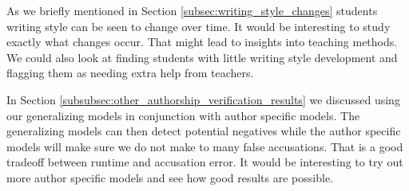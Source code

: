 As we briefly mentioned in Section \ref{subsec:writing_style_changes} students
writing style can be seen to change over time. It would be interesting to study
exactly what changes occur. That might lead to insights into teaching methods.
We could also look at finding students with little writing style development and
flagging them as needing extra help from teachers.

In Section \ref{subsubsec:other_authorship_verification_results} we discussed
using our generalizing models in conjunction with author specific models. The
generalizing models can then detect potential negatives while the author
specific models will make sure we do not make to many false accusations. That is
a good tradeoff between runtime and accusation error. It would be interesting to
try out more author specific models and see how good results are possible.

